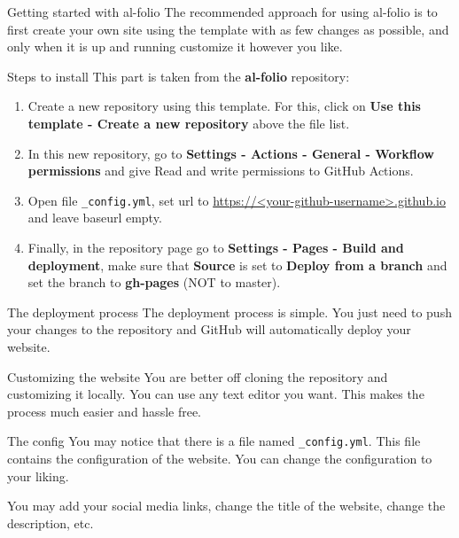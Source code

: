 \documentclass{beamer}
\begin{document}
\begin{frame}{Getting started with al-folio}
    The recommended approach for using al-folio is to first create your own site using the template with as few changes as possible, and only when it is up and running customize it however you like. 
\end{frame}

\begin{frame}{Steps to install}
    This part is taken from the \textbf{al-folio} repository:
    \begin{enumerate}
        \item Create a new repository using this template. For this, click on \textbf{Use this template - Create a new repository} above the file list.
        \item In this new repository, go to \textbf{Settings - Actions - General - Workflow permissions} and give Read and write permissions to GitHub Actions.
        \item Open file \texttt{\_config.yml}, set url to \url{https://<your-github-username>.github.io} and leave baseurl empty.
        \item Finally, in the repository page go to \textbf{Settings - Pages - Build and deployment}, make sure that \textbf{Source} is set to \textbf{Deploy from a branch} and set the branch to \textbf{gh-pages} (NOT to master).
        \end{enumerate}
\end{frame}

\begin{frame}{The deployment process}
    The deployment process is simple. You just need to push your changes to the repository and GitHub will automatically deploy your website.
\end{frame}

\begin{frame}{Customizing the website}
    You are better off cloning the repository and customizing it locally. You can use any text editor you want. This makes the process much easier and hassle free.
\end{frame}

\begin{frame}{The config}
    You may notice that there is a file named \texttt{\_config.yml}. This file contains the configuration of the website. You can change the configuration to your liking.

    You may add your social media links, change the title of the website, change the description, etc.
\end{frame}
\end{document}
